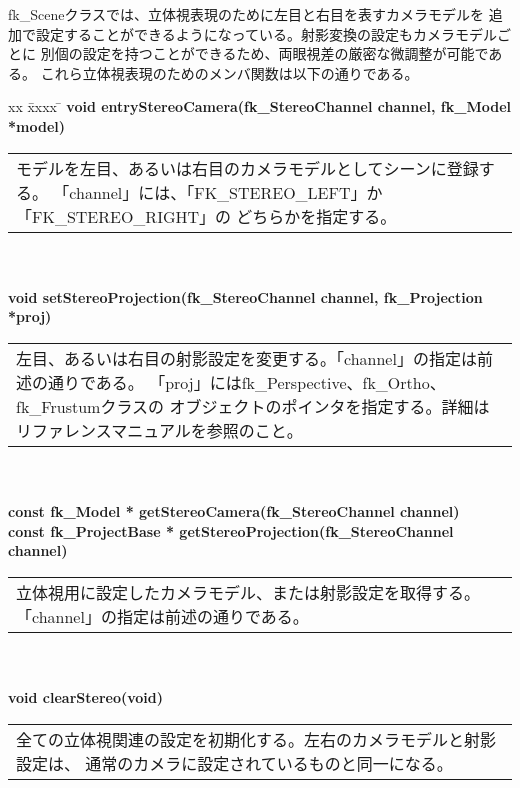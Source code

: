 fk\_Sceneクラスでは、立体視表現のために左目と右目を表すカメラモデルを
追加で設定することができるようになっている。射影変換の設定もカメラモデルごとに
別個の設定を持つことができるため、両眼視差の厳密な微調整が可能である。
これら立体視表現のためのメンバ関数は以下の通りである。
\begin{tabbing}
xx \= xxxx \= \kill
\> \textbf{void entryStereoCamera(fk\_StereoChannel channel, fk\_Model *model)} \\
	\> \> \begin{tabular}{p{15cm}}
		モデルを左目、あるいは右目のカメラモデルとしてシーンに登録する。
		「channel」には、「FK\_STEREO\_LEFT」か「FK\_STEREO\_RIGHT」の
		どちらかを指定する。
	\end{tabular} \\ \\

\> \textbf{void setStereoProjection(fk\_StereoChannel channel, fk\_Projection *proj)} \\
	\> \> \begin{tabular}{p{15cm}}
		左目、あるいは右目の射影設定を変更する。「channel」の指定は前述の通りである。
		「proj」にはfk\_Perspective、fk\_Ortho、fk\_Frustumクラスの
		オブジェクトのポインタを指定する。詳細はリファレンスマニュアルを参照のこと。
	\end{tabular} \\ \\

\> \textbf{const fk\_Model * getStereoCamera(fk\_StereoChannel channel)} \\
\> \textbf{const fk\_ProjectBase * getStereoProjection(fk\_StereoChannel channel)} \\
	\> \> \begin{tabular}{p{15cm}}
		立体視用に設定したカメラモデル、または射影設定を取得する。
		「channel」の指定は前述の通りである。
	\end{tabular} \\ \\

\> \textbf{void clearStereo(void)} \\
	\> \> \begin{tabular}{p{15cm}}
		全ての立体視関連の設定を初期化する。左右のカメラモデルと射影設定は、
		通常のカメラに設定されているものと同一になる。
	\end{tabular}
\end{tabbing}

